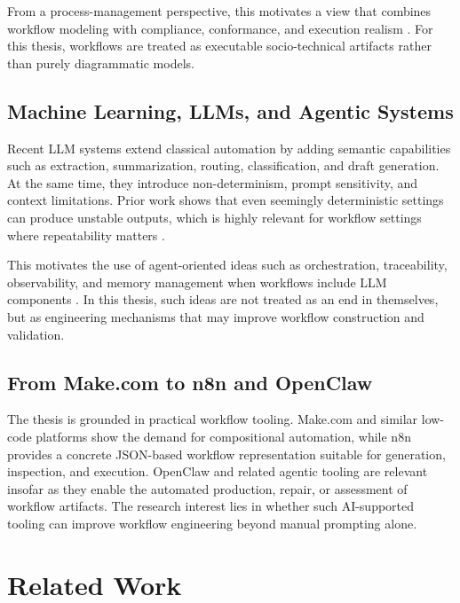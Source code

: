 \documentclass[12pt,a4paper]{article}
\begin{document}
From a process-management perspective, this motivates a view that combines workflow modeling with compliance, conformance, and execution realism \cite{Wes07,RA08,LMX07,elkharbili2008bpcc}. For this thesis, workflows are treated as executable socio-technical artifacts rather than purely diagrammatic models.

\subsection{Machine Learning, LLMs, and Agentic Systems}

Recent LLM systems extend classical automation by adding semantic capabilities such as extraction, summarization, routing, classification, and draft generation. At the same time, they introduce non-determinism, prompt sensitivity, and context limitations. Prior work shows that even seemingly deterministic settings can produce unstable outputs, which is highly relevant for workflow settings where repeatability matters \cite{atil2024nondeterminism,yuan2025numerical}.

This motivates the use of agent-oriented ideas such as orchestration, traceability, observability, and memory management when workflows include LLM components \cite{dong2024agentops_observability,barrak2025traceability_accountability_multiagent,packer2023memgpt,zhang2024survey_memory_mechanism_agents}. In this thesis, such ideas are not treated as an end in themselves, but as engineering mechanisms that may improve workflow construction and validation.

\subsection{From Make.com to n8n and OpenClaw}

The thesis is grounded in practical workflow tooling. Make.com and similar low-code platforms show the demand for compositional automation, while n8n provides a concrete JSON-based workflow representation suitable for generation, inspection, and execution. OpenClaw and related agentic tooling are relevant insofar as they enable the automated production, repair, or assessment of workflow artifacts. The research interest lies in whether such AI-supported tooling can improve workflow engineering beyond manual prompting alone.

\section{Related Work}
\end{document}
